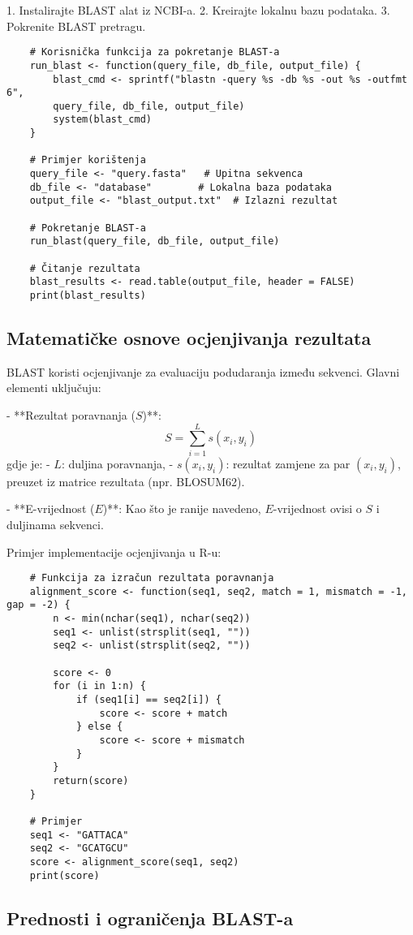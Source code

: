 \documentclass[10pt,a4paper,twoside]{article}
\begin{document}
1. Instalirajte BLAST alat iz NCBI-a.
2. Kreirajte lokalnu bazu podataka.
3. Pokrenite BLAST pretragu.

\begin{verbatim}
	# Korisnička funkcija za pokretanje BLAST-a
	run_blast <- function(query_file, db_file, output_file) {
		blast_cmd <- sprintf("blastn -query %s -db %s -out %s -outfmt 6", 
		query_file, db_file, output_file)
		system(blast_cmd)
	}
	
	# Primjer korištenja
	query_file <- "query.fasta"   # Upitna sekvenca
	db_file <- "database"        # Lokalna baza podataka
	output_file <- "blast_output.txt"  # Izlazni rezultat
	
	# Pokretanje BLAST-a
	run_blast(query_file, db_file, output_file)
	
	# Čitanje rezultata
	blast_results <- read.table(output_file, header = FALSE)
	print(blast_results)
\end{verbatim}

\subsection*{Matematičke osnove ocjenjivanja rezultata}

BLAST koristi ocjenjivanje za evaluaciju podudaranja između sekvenci. Glavni elementi uključuju:

- **Rezultat poravnanja (\( S \))**:
\[
S = \sum_{i=1}^L s(x_i, y_i)
\]
gdje je:
- \( L \): duljina poravnanja,
- \( s(x_i, y_i) \): rezultat zamjene za par \( (x_i, y_i) \), preuzet iz matrice rezultata (npr. BLOSUM62).

- **E-vrijednost (\( E \))**:
Kao što je ranije navedeno, \( E \)-vrijednost ovisi o \( S \) i duljinama sekvenci.

Primjer implementacije ocjenjivanja u R-u:
\begin{verbatim}
	# Funkcija za izračun rezultata poravnanja
	alignment_score <- function(seq1, seq2, match = 1, mismatch = -1, gap = -2) {
		n <- min(nchar(seq1), nchar(seq2))
		seq1 <- unlist(strsplit(seq1, ""))
		seq2 <- unlist(strsplit(seq2, ""))
		
		score <- 0
		for (i in 1:n) {
			if (seq1[i] == seq2[i]) {
				score <- score + match
			} else {
				score <- score + mismatch
			}
		}
		return(score)
	}
	
	# Primjer
	seq1 <- "GATTACA"
	seq2 <- "GCATGCU"
	score <- alignment_score(seq1, seq2)
	print(score)
\end{verbatim}

\subsection*{Prednosti i ograničenja BLAST-a}
\end{document}
